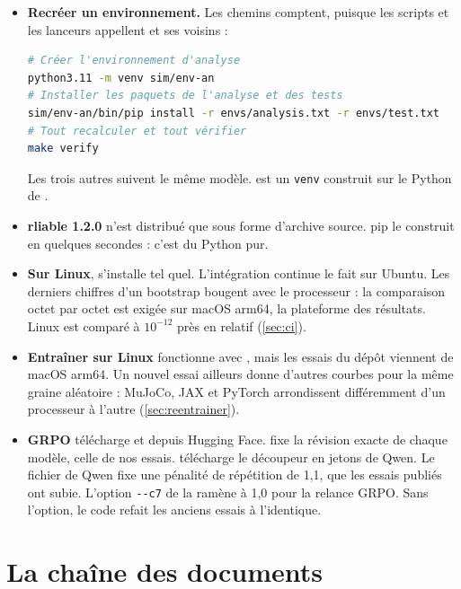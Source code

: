 \begin{itemize}
  \item \textbf{Recréer un environnement.} Les chemins comptent, puisque les scripts et les
        lanceurs appellent  et ses voisins :
\begin{lstlisting}[language=bash]
# Créer l'environnement d'analyse
python3.11 -m venv sim/env-an
# Installer les paquets de l'analyse et des tests
sim/env-an/bin/pip install -r envs/analysis.txt -r envs/test.txt
# Tout recalculer et tout vérifier
make verify
\end{lstlisting}
        Les trois autres suivent le même modèle.  est un \texttt{venv} construit
        sur le Python de .
  \item \textbf{rliable 1.2.0} n'est distribué que sous forme d'archive source. pip le construit en
        quelques secondes : c'est du Python pur.
  \item \textbf{Sur Linux},  s'installe tel quel. L'intégration continue le fait
        sur Ubuntu. Les derniers chiffres d'un bootstrap bougent avec le processeur : la comparaison
        octet par octet est exigée sur macOS arm64, la plateforme des résultats. Linux est
        comparé à $10^{-12}$ près en relatif (\cref{sec:ci}).
  \item \textbf{Entraîner sur Linux} fonctionne avec , mais les essais du dépôt
        viennent de macOS arm64. Un nouvel essai ailleurs donne d'autres courbes pour la même
        graine aléatoire : MuJoCo, JAX et PyTorch arrondissent différemment d'un processeur à l'autre
        (\cref{sec:reentrainer}).
  \item \textbf{GRPO} télécharge  et
         depuis Hugging Face.  fixe la révision exacte de chaque modèle, celle de nos essais.
                 télécharge le découpeur en jetons de Qwen. Le fichier
         de Qwen fixe une pénalité de répétition de 1,1, que les
        essais publiés ont subie. L'option \texttt{-{}-c7} de 
        la ramène à 1,0 pour la relance GRPO. Sans l'option, le code refait les anciens essais à l'identique.
\end{itemize}

\section{La chaîne des documents}
\label{sec:d-chaine}

